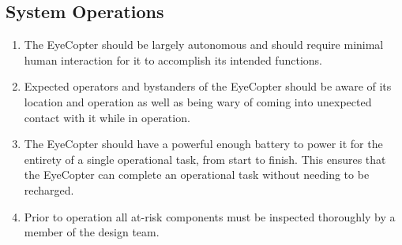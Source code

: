 \documentclass[10pt,letterpaper]{article}
\begin{document}
\subsection{System Operations}
\begin{enumerate}[label=\textbf{SO\arabic*}]
\item The EyeCopter should be largely autonomous and should require minimal human interaction for it to accomplish its intended functions. 
\item Expected operators and bystanders of the EyeCopter should be aware of its location and operation as well as being wary of coming into unexpected contact with it while in operation.
\item The EyeCopter should have a powerful enough battery to power it for the entirety of a single operational task, from start to finish. This ensures that the EyeCopter can complete an operational task without needing to be recharged.
\item Prior to operation all at-risk components must be inspected thoroughly by a member of the design team.
\end{enumerate}
\end{document}
